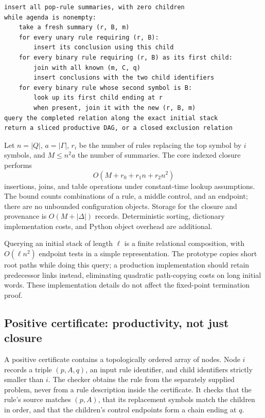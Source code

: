 \begin{lstlisting}[caption={Agenda skeleton; the accompanying implementation includes both join directions.}]
insert all pop-rule summaries, with zero children
while agenda is nonempty:
    take a fresh summary (r, B, m)
    for every unary rule requiring (r, B):
        insert its conclusion using this child
    for every binary rule requiring (r, B) as its first child:
        join with all known (m, C, q)
        insert conclusions with the two child identifiers
    for every binary rule whose second symbol is B:
        look up its first child ending at r
        when present, join it with the new (r, B, m)
query the completed relation along the exact initial stack
return a sliced productive DAG, or a closed exclusion relation
\end{lstlisting}

Let $n=|Q|$, $a=|\Gamma|$, $r_i$ be the number of rules replacing the top
symbol by $i$ symbols, and $M\leq n^2a$ the number of summaries. The core
indexed closure performs
\[
 O(M+r_0+r_1n+r_2n^2)
\]
insertions, joins, and table operations under constant-time lookup assumptions.
The bound counts combinations of a rule, a middle control, and an endpoint;
there are no unbounded configuration objects. Storage for the closure and
provenance is $O(M+|\Delta|)$ records. Deterministic sorting, dictionary
implementation costs, and Python object overhead are additional.

Querying an initial stack of length $\ell$ is a finite relational composition,
with $O(\ell n^2)$ endpoint tests in a simple representation. The prototype
copies short root paths while doing this query; a production implementation
should retain predecessor links instead, eliminating quadratic path-copying
costs on long initial words. These implementation details do not affect the
fixed-point termination proof.

\subsection{Positive certificate: productivity, not just closure}
A positive certificate contains a topologically ordered array of nodes. Node
$i$ records a triple $(p,A,q)$, an input rule identifier, and child identifiers
strictly smaller than $i$. The checker obtains the rule from the separately
supplied problem, never from a rule description inside the certificate.
It checks that the rule's source matches $(p,A)$, that its replacement symbols
match the children in order, and that the children's control endpoints form a
chain ending at $q$.

